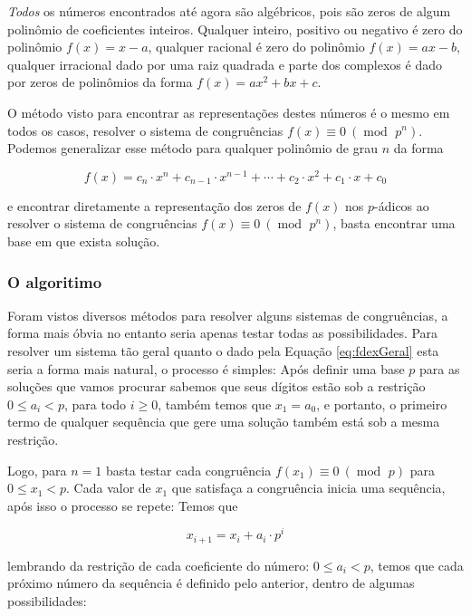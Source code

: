 \documentclass{report}
\DeclareMathOperator{\modulo}{mod \ }
\theoremstyle{definition}
\begin{document}
\emph{Todos} os números encontrados até agora são algébricos, pois são zeros de algum polinômio de coeficientes inteiros. Qualquer inteiro, positivo ou negativo é zero do polinômio $f(x) = x-a$, qualquer racional é zero do polinômio $f(x) = ax-b$, qualquer irracional dado por uma raiz quadrada e parte dos complexos é dado por zeros de polinômios da forma $f(x) = ax^2+bx+c$. 

O método visto para encontrar as representações destes números é o mesmo em todos os casos, resolver o sistema de congruências $f(x) \equiv 0 \ (\modulo p^n)$. Podemos generalizar esse método para qualquer polinômio de grau $n$ da forma

\begin{equation}\label{eq:fdexGeral}
    f(x) = c_n \cdot x^n + c_{n-1} \cdot x^{n-1} + \cdots + c_2 \cdot x^2 + c_1 \cdot x + c_0
\end{equation}

e encontrar diretamente a representação dos zeros de $f(x)$ nos $p$-ádicos ao resolver o sistema de congruências $f(x) \equiv 0 \ (\modulo p^n)$, basta encontrar uma base em que exista solução. 

\subsubsection*{O algoritimo}

Foram vistos diversos métodos para resolver alguns sistemas de congruências, a forma mais óbvia no entanto seria apenas testar todas as possibilidades. Para resolver um sistema tão geral quanto o dado pela Equação \ref{eq:fdexGeral} esta seria a forma mais natural, o processo é simples: Após definir uma base $p$ para as soluções que vamos procurar sabemos que seus dígitos estão sob a restrição $0 \leq a_i < p$, para todo $i \geq 0$, também temos que $x_1 = a_0$, e portanto, o primeiro termo de qualquer sequência que gere uma solução também está sob a mesma restrição.

Logo, para $n = 1$ basta testar cada congruência $f(x_1) \equiv 0 \ (\modulo p)$ para $0 \leq x_1 < p$. Cada valor de $x_1$ que satisfaça a congruência inicia uma sequência, após isso o processo se repete: Temos que

\begin{equation}
    x_{i+1} = x_i + a_i \cdot p^i
\end{equation}

lembrando da restrição de cada coeficiente do número: $0 \leq a_i < p$, temos que cada próximo número da sequência é definido pelo anterior, dentro de algumas possibilidades:
\end{document}

